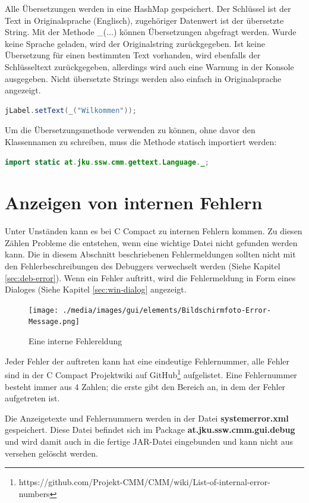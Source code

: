 Alle Übersetzungen werden in eine HashMap gespeichert. Der Schlüssel ist der Text in Originalsprache (Englisch), zugehöriger Datenwert ist der übersetzte String. Mit der Methode \glqq{}\_(...)\grqq{} können Übersetzungen abgefragt werden. Wurde keine Sprache geladen, wird der Originalstring zurückgegeben. Ist keine Übersetzung für einen bestimmten Text vorhanden, wird ebenfalls der Schlüsseltext zurückgegeben, allerdings wird auch eine Warnung in der Konsole ausgegeben. Nicht übersetzte Strings werden also einfach in Originalsprache angezeigt.
\begin{lstlisting}[language=JAVA]
jLabel.setText(_("Wilkommen"));
\end{lstlisting}

Um die Übersetzungsmethode verwenden zu können, ohne davor den Klassennamen zu schreiben, muss die Methode statisch importiert werden:
\begin{lstlisting}[language=JAVA]
import static at.jku.ssw.cmm.gettext.Language._;
\end{lstlisting}

\section{Anzeigen von internen Fehlern}
\label{sec:gui-int-error}
Unter Unständen kann es bei C Compact zu internen Fehlern kommen. Zu diesen Zählen Probleme die entstehen, wenn eine wichtige Datei nicht gefunden werden kann. Die in diesem Abschnitt beschriebenen Fehlermeldungen sollten nicht mit den Fehlerbeschreibungen des Debuggers verwechselt werden (Siehe Kapitel \ref{sec:deb-error}). Wenn ein Fehler auftritt, wird die Fehlermeldung in Form eines Dialoges (Siehe Kapitel \ref{sec:win-dialog} angezeigt.

\begin{figure}[htp]
\centering
\texttt{[image: ./media/images/gui/elements/Bildschirmfoto-Error-Message.png]}
\caption{Eine interne Fehlereldung}
\end{figure}

Jeder Fehler der auftreten kann hat eine eindeutige Fehlernummer, alle Fehler sind in der C Compact Projektwiki auf GitHub\footnote{https://github.com/Projekt-CMM/CMM/wiki/List-of-internal-error-numbers} aufgelistet. Eine Fehlernummer besteht immer aus 4 Zahlen; die erste gibt den Bereich an, in dem der Fehler aufgetreten ist.

Die Anzeigetexte und Fehlernummern werden in der Datei \textbf{systemerror.xml} gespeichert. Diese Datei befindet sich im Package \textbf{at.jku.ssw.cmm.gui.debug} und wird damit auch in die fertige JAR-Datei eingebunden und kann nicht aus versehen gelöscht werden.

